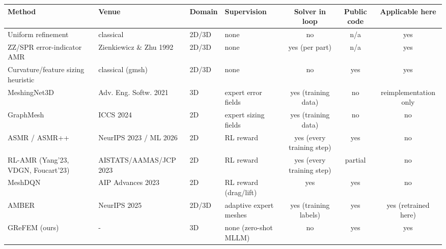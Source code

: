 \begin{tabular}{l l l l c c c}
\toprule
Method & Venue & Domain & Supervision & Solver in loop & Public code & Applicable here \\
\midrule
Uniform refinement & classical & 2D/3D & none & no & n/a & yes \\
ZZ/SPR error-indicator AMR & Zienkiewicz \& Zhu 1992 & 2D/3D & none & yes (per part) & n/a & yes \\
Curvature/feature sizing heuristic & classical (gmsh) & 2D/3D & none & no & yes & yes \\
MeshingNet3D & Adv. Eng. Softw. 2021 & 3D & expert error fields & yes (training data) & no & reimplementation only \\
GraphMesh & ICCS 2024 & 2D & expert sizing fields & yes (training data) & no & no \\
ASMR / ASMR++ & NeurIPS 2023 / ML 2026 & 2D & RL reward & yes (every training step) & yes & no \\
RL-AMR (Yang'23, VDGN, Foucart'23) & AISTATS/AAMAS/JCP 2023 & 2D & RL reward & yes (every training step) & partial & no \\
MeshDQN & AIP Advances 2023 & 2D & RL reward (drag/lift) & yes & yes & no \\
AMBER & NeurIPS 2025 & 2D/3D & adaptive expert meshes & yes (training labels) & yes & yes (retrained here) \\
GReFEM (ours) & - & 3D & none (zero-shot MLLM) & no & yes & yes \\
\bottomrule
\end{tabular}
